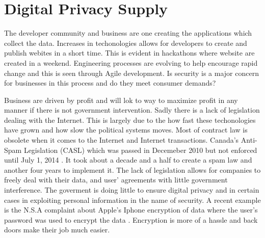 \documentclass[12pt]{article}
\begin{document}
\section{Digital Privacy Supply}\label{sec:supply}

The developer community and business are one creating the applications which collect the data. Increases in techonologies allows for developers to create and publish webites in a short time. This is evident in hackathons where website are created in a weekend. Engineering processes are evolving to help encourage rapid change and this is seen through Agile development. Is security is a major concern for businesses in this process and do they meet consumer demands?

Business are driven by profit and will lok to way to maximize profit in any manner if there is not government intervention. Sadly there is a lack of legislation dealing with the Internet. This is largely due to the how fast these techonologies have grown and how slow the political systems moves. Most of contract law is obsolete when it comes to the Internet and Internet transactions. Canada's Anti-Spam Legislation (CASL) which was passed in Decemeber 2010 but not enforced until July 1, 2014 \cite{FastFacts}. It took about a decade and a half to create a spam law and another four years to implement it. The lack of legislation allows for companies to freely deal with their data, and user' agreements with little government interference. The goverment is doing little to ensure digital privacy and in certain cases in exploiting personal information in the name of security. A recent example is the N.S.A complaint about Apple's Iphone encryption of data where the user's password was used to encrypt the data \cite{Schneier}. Encryption is more of a hassle and back doors make their job much easier.
\end{document}
